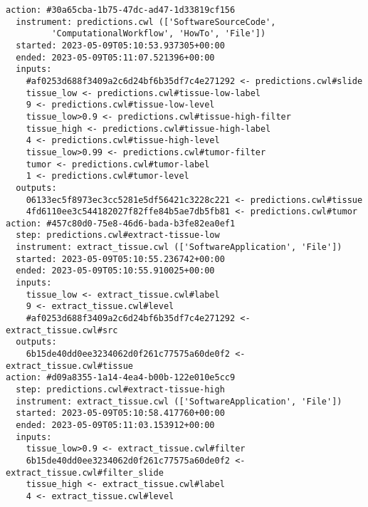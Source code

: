\begin{lstlisting}[float,basicstyle=\scriptsize\ttfamily,caption={Output of the \texttt{runcrate report} command executed on the Provenance Run Crate generated by StreamFlow in the digital pathology inference use case (Section~\ref{wrroc:provenance-run-crate-for-digital-pathology}). This informal listing of relevant RO-Crate entities describes each step of the execution. Note that inputs and outputs are of different types (not shown): e.g., \texttt{tissue\_low>0.9} is a string parameter, \texttt{6b15de\dots} is a filename, and \texttt{\#af0253\dots} is a collection.},label={lst:wrroc:ml_pipeline_streamflow_report}]
action: #30a65cba-1b75-47dc-ad47-1d33819cf156
  instrument: predictions.cwl (['SoftwareSourceCode', 
         'ComputationalWorkflow', 'HowTo', 'File'])
  started: 2023-05-09T05:10:53.937305+00:00
  ended: 2023-05-09T05:11:07.521396+00:00
  inputs:
    #af0253d688f3409a2c6d24bf6b35df7c4e271292 <- predictions.cwl#slide
    tissue_low <- predictions.cwl#tissue-low-label
    9 <- predictions.cwl#tissue-low-level
    tissue_low>0.9 <- predictions.cwl#tissue-high-filter
    tissue_high <- predictions.cwl#tissue-high-label
    4 <- predictions.cwl#tissue-high-level
    tissue_low>0.99 <- predictions.cwl#tumor-filter
    tumor <- predictions.cwl#tumor-label
    1 <- predictions.cwl#tumor-level
  outputs:
    06133ec5f8973ec3cc5281e5df56421c3228c221 <- predictions.cwl#tissue
    4fd6110ee3c544182027f82ffe84b5ae7db5fb81 <- predictions.cwl#tumor
action: #457c80d0-75e8-46d6-bada-b3fe82ea0ef1
  step: predictions.cwl#extract-tissue-low
  instrument: extract_tissue.cwl (['SoftwareApplication', 'File'])
  started: 2023-05-09T05:10:55.236742+00:00
  ended: 2023-05-09T05:10:55.910025+00:00
  inputs:
    tissue_low <- extract_tissue.cwl#label
    9 <- extract_tissue.cwl#level
    #af0253d688f3409a2c6d24bf6b35df7c4e271292 <- extract_tissue.cwl#src
  outputs:
    6b15de40dd0ee3234062d0f261c77575a60de0f2 <- extract_tissue.cwl#tissue
action: #d09a8355-1a14-4ea4-b00b-122e010e5cc9
  step: predictions.cwl#extract-tissue-high
  instrument: extract_tissue.cwl (['SoftwareApplication', 'File'])
  started: 2023-05-09T05:10:58.417760+00:00
  ended: 2023-05-09T05:11:03.153912+00:00
  inputs:
    tissue_low>0.9 <- extract_tissue.cwl#filter
    6b15de40dd0ee3234062d0f261c77575a60de0f2 <- extract_tissue.cwl#filter_slide
    tissue_high <- extract_tissue.cwl#label
    4 <- extract_tissue.cwl#level

\end{lstlisting}
